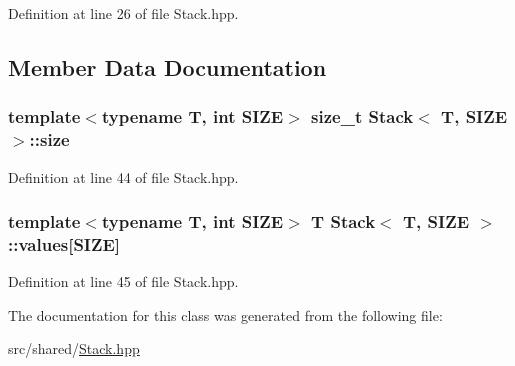 Definition at line 26 of file Stack.\-hpp.



\subsection{Member Data Documentation}
\hypertarget{classStack_a2bf4c06162c7356ca41792de93a68f49}{
\subsubsection[{size}]{\setlength{\rightskip}{0pt plus 5cm}template$<$typename T, int S\-I\-Z\-E$>$ size\-\_\-t {\bf Stack}$<$ T, S\-I\-Z\-E $>$\-::size\hspace{0.3cm}{\ttfamily [private]}}}\label{classStack_a2bf4c06162c7356ca41792de93a68f49}


Definition at line 44 of file Stack.\-hpp.

\hypertarget{classStack_ad6737211e34f9e427b9c91f32a16ad18}{
\subsubsection[{values}]{\setlength{\rightskip}{0pt plus 5cm}template$<$typename T, int S\-I\-Z\-E$>$ T {\bf Stack}$<$ T, S\-I\-Z\-E $>$\-::values\mbox{[}S\-I\-Z\-E\mbox{]}\hspace{0.3cm}{\ttfamily [private]}}}\label{classStack_ad6737211e34f9e427b9c91f32a16ad18}


Definition at line 45 of file Stack.\-hpp.



The documentation for this class was generated from the following file\-:\begin{DoxyCompactItemize}
\item 
src/shared/\hyperlink{Stack_8hpp}{Stack.\-hpp}\end{DoxyCompactItemize}
